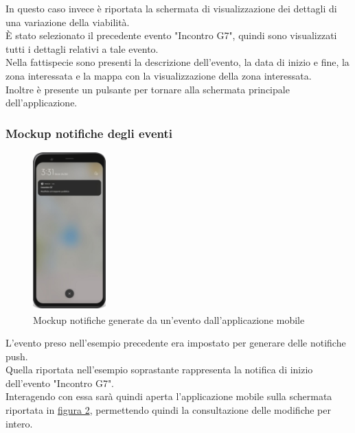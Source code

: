 \documentclass{article}
\begin{document}
In questo caso invece è riportata la schermata di visualizzazione dei dettagli di una variazione della viabilità.\\
È stato selezionato il precedente evento "Incontro G7", quindi sono visualizzati tutti i dettagli relativi a tale evento.\\
Nella fattispecie sono presenti la descrizione dell'evento, la data di inizio e fine, la zona interessata e la mappa con la visualizzazione della zona interessata.\\
Inoltre è presente un pulsante per tornare alla schermata principale dell'applicazione.\\
\clearpage

\subsubsection{Mockup notifiche degli eventi}

\begin{figure}[htbp]
    \label{4.1.3}
    \centering
    \includegraphics[width=0.25\textwidth]{Images/Mockup3 - Mobile.png}
    \caption{Mockup notifiche generate da un'evento dall'applicazione mobile}
\end{figure}

L'evento preso nell'esempio precedente era impostato per generare delle notifiche push.\\
Quella riportata nell'esempio soprastante rappresenta la notifica di inizio dell'evento "Incontro G7".\\
Interagendo con essa sarà quindi aperta l'applicazione mobile sulla schermata riportata in \hyperref[fig:Dettaglio_evento]{figura 2}, permettendo quindi la consultazione delle modifiche per intero.\\
\end{document}
